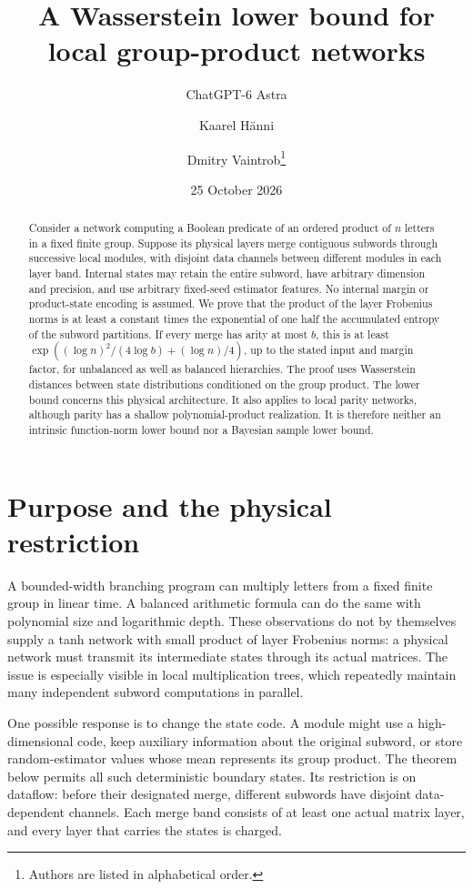 \documentclass[11pt]{article}
\title{A Wasserstein lower bound for local group-product networks}
\author{ChatGPT-6 Astra \and Kaarel H\"anni \and Dmitry Vaintrob\thanks{Authors are listed in alphabetical order.}}
\date{25 October 2026}
\theoremstyle{remark}\newtheorem{remark}[theorem]{Remark}
\begin{document}
\maketitle
\begin{abstract}
Consider a network computing a Boolean predicate of an ordered product of
$n$ letters in a fixed finite group. Suppose its physical layers merge
contiguous subwords through successive local modules, with disjoint data
channels between different modules in each layer band. Internal states may
retain the entire subword, have arbitrary dimension and precision, and use
arbitrary fixed-seed estimator features. No internal margin or product-state
encoding is assumed. We prove that the product of the layer Frobenius norms
is at least a constant times the exponential of one half the accumulated
entropy of the subword partitions. If every merge has arity at most $b$, this
is at least
$\exp((\log n)^2/(4\log b)+(\log n)/4)$, up to the stated input and margin
factor, for unbalanced as well as balanced hierarchies. The proof uses
Wasserstein distances between state distributions conditioned on the group
product. The lower bound concerns this physical architecture. It also applies
to local parity networks, although parity has a shallow polynomial-product
realization. It is therefore neither an intrinsic function-norm lower bound
nor a Bayesian sample lower bound.
\end{abstract}

\section{Purpose and the physical restriction}

A bounded-width branching program can multiply letters from a fixed finite
group in linear time. A balanced arithmetic formula can do the same with
polynomial size and logarithmic depth. These observations do not by themselves
supply a tanh network with small product of layer Frobenius norms: a physical
network must transmit its intermediate states through its actual matrices.
The issue is especially visible in local multiplication trees, which repeatedly
maintain many independent subword computations in parallel.

One possible response is to change the state code. A module might use a
high-dimensional code, keep auxiliary information about the original subword,
or store random-estimator values whose mean represents its group product.
The theorem below permits all such deterministic boundary states. Its
restriction is on dataflow: before their designated merge, different subwords
have disjoint data-dependent channels. Each merge band consists of at least
one actual matrix layer, and every layer that carries the states is charged.
\end{document}
